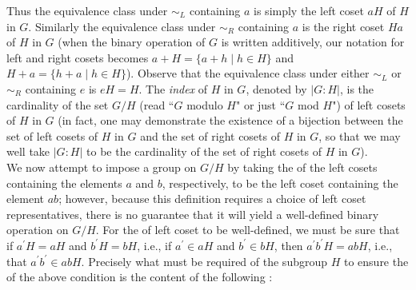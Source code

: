 \documentclass{article}
\theoremstyle{plain}
\theoremstyle{definition}
\newcommand{\set}[1]{\{#1\}}
\newcommand{\abs}[1]{\vert#1\vert}
\begin{document}
Thus the equivalence class under $\sim_L$ containing $a$ is simply the left coset $aH$ of $H$ in $G$. Similarly the equivalence class under $\sim_R$ containing $a$ is the right coset $Ha$ of $H$ in $G$ (when the binary operation of $G$ is written additively, our notation for left and right cosets becomes $a+H=\set{a+h\mid h\in H}$ and $H+a=\set{h+a\mid h\in H}$). Observe that the equivalence class under either $\sim_L$ or $\sim_R$ containing $e$ is $eH=H$. The \emph{index} of $H$ in $G$, denoted by $\abs{G:H}$, is
the cardinality of the set $G/H$ (read ``$G$ modulo $H$" or just ``$G$ mod $H$") of left cosets of $H$ in $G$ (in fact, one may demonstrate the existence of a bijection
between the set of left cosets of $H$ in $G$ and the set of right cosets of $H$ in $G$, so that we may well take $\abs{G:H}$ to be the cardinality of the set of right cosets of $H$ in $G$).\\  

We now attempt to impose a group on $G/H$ by taking the  of the left cosets containing the elements 
$a$ and $b$, respectively, to be the left coset containing the element $ab$; however, because this definition requires a choice of left coset representatives, there is no guarantee that it will yield a well-defined binary operation on $G/H$.  For the  of left coset  to be well-defined, we must be sure that if $a^\prime H=aH$ and $b^\prime H=bH$, i.e., if $a^\prime\in aH$ and $b^\prime\in bH$, then $a^\prime b^\prime H=abH$, i.e., that $a^\prime b^\prime\in abH$. Precisely what must be  required of the subgroup $H$ to ensure the  of the above condition is the content of the following :
\end{document}
